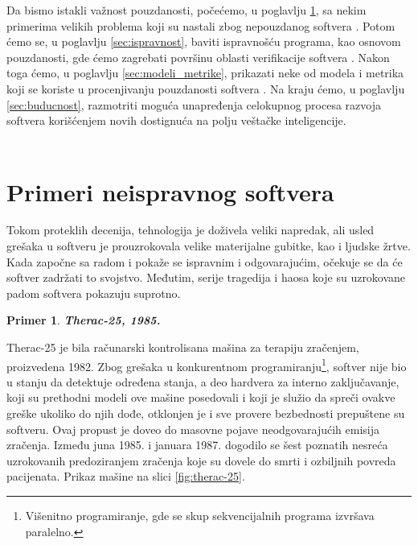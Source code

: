 \documentclass[a4paper]{article}
\newtheorem{primer}{Primer}[section]
\begin{document}
Da bismo istakli važnost pouzdanosti, počećemo, u poglavlju \ref{sec:neispravni_softver}, sa nekim primerima velikih problema koji su nastali zbog nepouzdanog softvera \cite{quinn_ethics}.
Potom ćemo se, u poglavlju \ref{sec:ispravnost}, baviti ispravnošću programa, kao osnovom pouzdanosti, gde ćemo zagrebati površinu oblasti verifikacije softvera \cite{laski2009software}.
Nakon toga ćemo, u poglavlju \ref{sec:modeli_metrike}, prikazati neke od modela i metrika koji se koriste u procenjivanju pouzdanosti softvera \cite{pham_reliability}.
Na kraju ćemo, u poglavlju \ref{sec:buducnost}, razmotriti moguća unapređenja celokupnog procesa razvoja softvera korišćenjem novih dostignuća na polju veštačke inteligencije.\\\\


\section{Primeri neispravnog softvera}
\label{sec:neispravni_softver}

Tokom proteklih decenija, tehnologija je doživela veliki napredak, ali usled grešaka u softveru je prouzrokovala velike materijalne gubitke, kao i ljudske žrtve. Kada započne sa radom i pokaže se ispravnim i odgovarajućim, očekuje se da će softver zadržati to svojstvo. Međutim, serije tragedija i haosa koje su uzrokovane padom softvera pokazuju suprotno.\\

\begin{primer}
\textbf{Therac-25, 1985.}
\end{primer}
Therac-25 je bila računarski kontrolisana mašina za terapiju zračenjem, proizvedena 1982.
Zbog grešaka u konkurentnom programiranju\footnote{ Višenitno programiranje, gde se skup sekvencijalnih programa izvršava paralelno.}, softver nije bio u stanju da detektuje određena stanja, a deo hardvera za interno zaključavanje, koji su prethodni modeli ove mašine posedovali i koji je služio da spreči ovakve greške ukoliko do njih dođe, otklonjen je i sve provere bezbednosti prepuštene su softveru. Ovaj propust je doveo do masovne pojave neodgovarajućih emisija zračenja.
Između juna 1985. i januara 1987. dogodilo se šest poznatih nesreća uzrokovanih predoziranjem zračenja koje su dovele do smrti i ozbiljnih povreda pacijenata. Prikaz mašine na slici \ref{fig:therac-25}.
\end{document}
